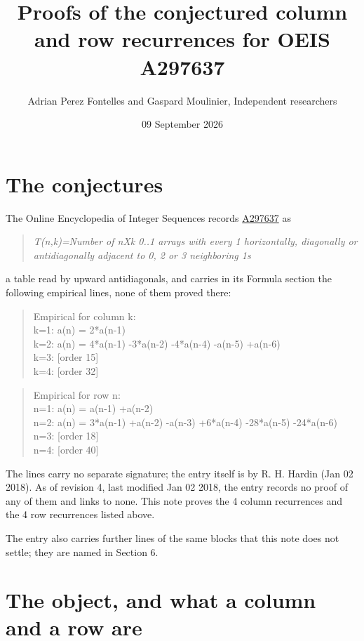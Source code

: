 \documentclass[11pt]{article}
\title{Proofs of the conjectured column and row recurrences for OEIS A297637}
\author{Adrian Perez Fontelles and Gaspard Moulinier, Independent researchers}
\date{09 September 2026}
\theoremstyle{definition}
\begin{document}
\maketitle
\section{The conjectures}

The Online Encyclopedia of Integer Sequences records \href{https://oeis.org/A297637}{A297637} as

\begin{quote}\itshape T(n,k)=Number of nXk 0..1 arrays with every 1 horizontally, diagonally or antidiagonally adjacent to 0, 2 or 3 neighboring 1s\end{quote}

a table read by upward antidiagonals, and carries in its Formula section the following empirical lines, none of them proved there:

\begin{quote}\ttfamily Empirical for column k:\\
k=1: a(n) = 2*a(n-1)\\k=2: a(n) = 4*a(n-1) -3*a(n-2) -4*a(n-4) -a(n-5) +a(n-6)\\k=3: [order 15]\\k=4: [order 32]\end{quote}

\begin{quote}\ttfamily Empirical for row n:\\
n=1: a(n) = a(n-1) +a(n-2)\\n=2: a(n) = 3*a(n-1) +a(n-2) -a(n-3) +6*a(n-4) -28*a(n-5) -24*a(n-6)\\n=3: [order 18]\\n=4: [order 40]\end{quote}

The lines carry no separate signature; the entry itself is by R. H. Hardin (Jan 02 2018). As of revision 4, last modified Jan 02 2018, the entry records no proof of any of them and links to none. This note proves the 4 column recurrences and the 4 row recurrences listed above.

The entry also carries further lines of the same blocks that this note does not settle; they are named in Section 6.

\section{The object, and what a column and a row are}
\end{document}
